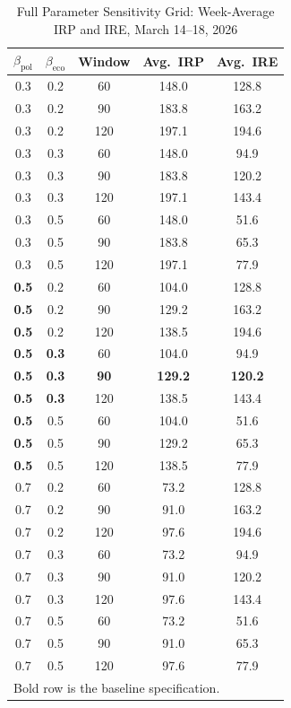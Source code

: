 \documentclass[12pt,a4paper]{article}
\begin{document}
\begin{table}[h!]
\centering
\caption{Full Parameter Sensitivity Grid: Week-Average IRP and IRE, March 14--18, 2026}
\label{tab:sensitivity_full}
\small
\begin{tabular}{ccccc}
\toprule
$\beta_{\text{pol}}$ & $\beta_{\text{eco}}$ & Window & Avg.\ IRP & Avg.\ IRE \\
\midrule
0.3 & 0.2 &  60 & 148.0 & 128.8 \\
0.3 & 0.2 &  90 & 183.8 & 163.2 \\
0.3 & 0.2 & 120 & 197.1 & 194.6 \\
0.3 & 0.3 &  60 & 148.0 &  94.9 \\
0.3 & 0.3 &  90 & 183.8 & 120.2 \\
0.3 & 0.3 & 120 & 197.1 & 143.4 \\
0.3 & 0.5 &  60 & 148.0 &  51.6 \\
0.3 & 0.5 &  90 & 183.8 &  65.3 \\
0.3 & 0.5 & 120 & 197.1 &  77.9 \\
\textbf{0.5} & 0.2 &  60 & 104.0 & 128.8 \\
\textbf{0.5} & 0.2 &  90 & 129.2 & 163.2 \\
\textbf{0.5} & 0.2 & 120 & 138.5 & 194.6 \\
\textbf{0.5} & \textbf{0.3} &  60 & 104.0 &  94.9 \\
\textbf{0.5} & \textbf{0.3} & \textbf{90}  & \textbf{129.2} & \textbf{120.2} \\
\textbf{0.5} & \textbf{0.3} & 120 & 138.5 & 143.4 \\
\textbf{0.5} & 0.5 &  60 & 104.0 &  51.6 \\
\textbf{0.5} & 0.5 &  90 & 129.2 &  65.3 \\
\textbf{0.5} & 0.5 & 120 & 138.5 &  77.9 \\
0.7 & 0.2 &  60 &  73.2 & 128.8 \\
0.7 & 0.2 &  90 &  91.0 & 163.2 \\
0.7 & 0.2 & 120 &  97.6 & 194.6 \\
0.7 & 0.3 &  60 &  73.2 &  94.9 \\
0.7 & 0.3 &  90 &  91.0 & 120.2 \\
0.7 & 0.3 & 120 &  97.6 & 143.4 \\
0.7 & 0.5 &  60 &  73.2 &  51.6 \\
0.7 & 0.5 &  90 &  91.0 &  65.3 \\
0.7 & 0.5 & 120 &  97.6 &  77.9 \\
\bottomrule
\multicolumn{5}{l}{\footnotesize Bold row is the baseline specification.}
\end{tabular}
\end{table}
\end{document}
